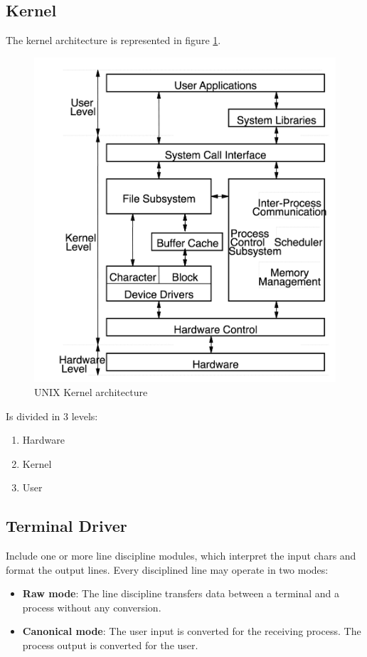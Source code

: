 \documentclass[12pt]{article}
\begin{document}
\subsection{Kernel}
The kernel architecture is represented in figure \ref{fig:unixkernel}.
\begin{figure}[h]
  \centering
  \includegraphics[width=0.8\linewidth]{images/unixkernel.png}
  \caption{UNIX Kernel architecture}
  \label{fig:unixkernel}
\end{figure}
Is divided in 3 levels:
\begin{enumerate}
  \item Hardware
  \item Kernel
  \item User
\end{enumerate}

\subsection{Terminal Driver}
Include one or more line discipline modules, which interpret the input chars and format the output lines. Every disciplined line may operate in two modes:
\begin{itemize}
  \item \textbf{Raw mode}: The line discipline transfers data between a terminal and a process without any conversion.
  \item \textbf{Canonical mode}: The user input is converted for the receiving process. The process output is converted for the user.
\end{itemize}
\end{document}
